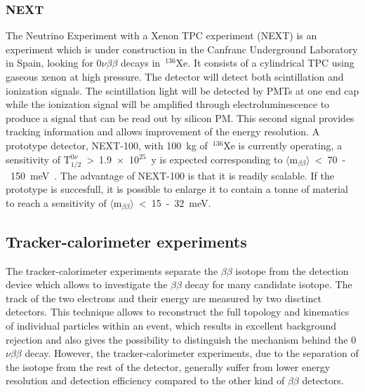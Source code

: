 \documentclass[main.tex]{subfiles}
\begin{document}
\FloatBarrier


\subsubsection{NEXT}


\NI The Neutrino Experiment with a Xenon TPC experiment (NEXT) is an experiment which is under construction in the Canfranc Underground Laboratory in Spain, looking for 0$\nu\beta\beta$ decays in~$^{\text{136}}$Xe. It consists of a cylindrical TPC using gaseous xenon at high pressure. The detector will detect both scintillation and ionization signals. The scintillation light will be detected by PMTs at one end cap while the ionization signal will be amplified through electroluminescence to produce a signal that can be read out by silicon PM. This second signal provides tracking information and allows improvement of the energy resolution. A prototype detector, NEXT-100, with 100~kg of~$^{\text{136}}$Xe is currently operating, a sensitivity of T$_{\text{1/2}}^{0\nu}$~>~1.9~$\times$~10$^{\text{25}}$~y is expected corresponding to $\langle \text{m}_{\beta\beta} \rangle$~<~70~-~150~meV~\cite{NEXT}. The advantage of NEXT-100 is that it is readily scalable. If the prototype is succesfull, it is possible to enlarge it to contain a tonne of material to reach a sensitivity of $\langle \text{m}_{\beta\beta} \rangle$~<~15~-~32~meV.



\subsection{Tracker-calorimeter experiments}


\NI The tracker-calorimeter experiments separate the $\beta\beta$ isotope from the detection device which allows to investigate the $\beta\beta$ decay for many candidate isotope. The track of the two electrons and their energy are measured by two disctinct detectors. This technique allows to reconstruct the full topology and kinematics of individual particles within an event, which results in excellent background rejection and also gives the possibility to distinguish the mechanism behind the 0$\nu\beta\beta$ decay. However, the tracker-calorimeter experiments, due to the separation of the isotope from the rest of the detector, generally suffer from lower energy resolution and detection efficiency compared to the other kind of $\beta\beta$ detectors. 


\bigskip
\end{document}
